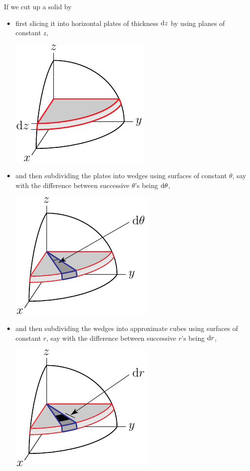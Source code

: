 If we cut up a solid by
\begin{itemize}
\item
first slicing it into horizontal plates of thickness $\mathrm{d}z$
by using planes of constant $z$,
\begin{efig}
\begin{center}
    \includegraphics{sphereCyl1.pdf}
\end{center}
\end{efig}

\item
and then subdividing the plates into wedges using surfaces of  constant $\theta$,
say with the difference between successive $\theta$'s being $\mathrm{d}\theta$,
\begin{efig}
\begin{center}
    \includegraphics{sphereCyl2.pdf}
\end{center}
\end{efig}
\item
and then subdividing the wedges into approximate cubes using surfaces 
of  constant $r$, say with the difference between successive $r$'s 
being $\mathrm{d}r$,
\begin{efig}
\begin{center}
    \includegraphics{sphereCyl3.pdf}
\end{center}
\end{efig}
\end{itemize}
